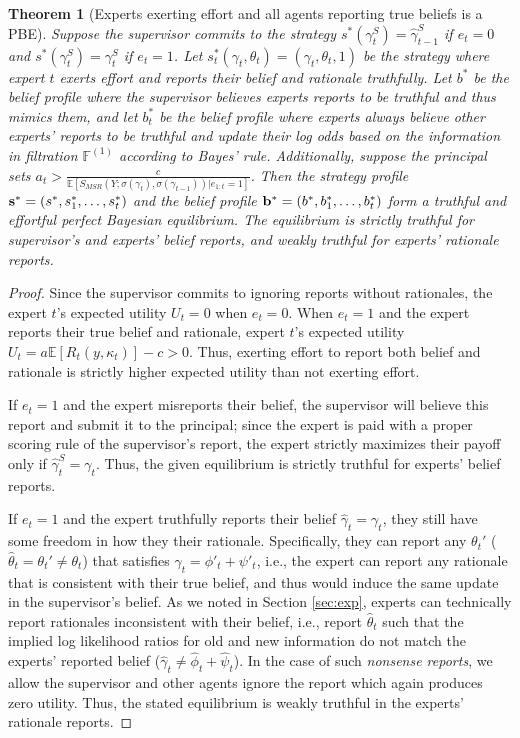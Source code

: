 \documentclass{winnower}
\newtheorem{theorem}{Theorem}
\begin{document}
\begin{theorem}[Experts exerting effort and all agents reporting true beliefs is a PBE]\label{thm:main}
Suppose the supervisor commits to the strategy $s^*({\gamma}_t^S) = \hat{\gamma}_{t-1}^S$ if $e_t = 0$ and $s^*({\gamma}_t^S) = \gamma_t^S$ if $e_t = 1$. Let $s_t^*(\gamma_t, \theta_t) = (\gamma_t, \theta_t, 1)$ be the strategy where expert $t$ exerts effort and reports their belief and rationale truthfully. Let $b^*$ be the belief profile where the supervisor believes experts reports to be truthful and thus mimics them, and let $b^*_t$ be the belief profile where experts always believe other experts' reports to be truthful and update their log odds based on the information in filtration $\mathbb{F}^{(1)}$ according to Bayes' rule. Additionally, suppose the principal sets $a_t > \frac{c}{\mathbb{E}[S_{MSR}(Y; \sigma(\gamma_t), \sigma(\gamma_{t-1}))|e_{1:t}=1]}$. Then the strategy profile ${\bf s}^* = (s^*, s_1^*, \ldots, s_t^*)$ and the belief profile ${\bf b}^* = (b^*, b_1^*, \ldots, b_t^*)$ form a truthful and effortful perfect Bayesian equilibrium. The equilibrium is strictly truthful for supervisor's and experts' belief reports, and weakly truthful for experts' rationale reports.
\end{theorem}

\begin{proof}
    Since the supervisor commits to ignoring reports without rationales, the expert $t$'s expected utility $U_t=0$ when $e_t=0$. When $e_t=1$ and the expert reports their true belief and rationale, expert $t$'s expected utility $U_t = a \mathbb{E}[R_t(y, \kappa_t)] - c > 0$. Thus, exerting effort to report both belief and rationale is strictly higher expected utility than not exerting effort.
    
    If $e_t=1$ and the expert misreports their belief, the supervisor will believe this report and submit it to the principal; since the expert is paid with a proper scoring rule of the supervisor's report, the expert strictly maximizes their payoff only if $\hat{\gamma}_t^S = \gamma_t$. Thus, the given equilibrium is strictly truthful for experts' belief reports.
    
    If $e_t = 1$ and the expert truthfully reports their belief $\hat{\gamma}_t= \gamma_t$, they still have some freedom in how they their rationale. Specifically, they can report any $\theta_t'$ ($\hat{\theta}_t = \theta_t' \neq \theta_t$) that satisfies $\gamma_t = \phi'_t + \psi'_t$, i.e., the expert can report any rationale that is consistent with their true belief, and thus would induce the same update in the supervisor's belief. As we noted in Section \ref{sec:exp}, experts can technically report rationales inconsistent with their belief, i.e., report $\hat{\theta}_t$ such that the implied log likelihood ratios for old and new information do not match the experts' reported belief ($\hat{\gamma}_t \neq \hat{\phi}_t  + \hat{\psi}_t$). In the case of such \emph{nonsense reports}, we allow the supervisor and other agents ignore the report which again produces zero utility. Thus, the stated equilibrium is weakly truthful in the experts' rationale reports.
\end{proof}
\end{document}
